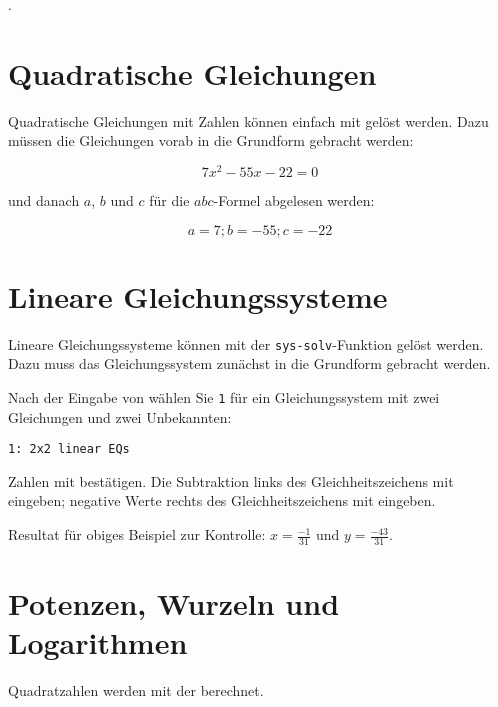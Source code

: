 .
\newpage


\section{Quadratische Gleichungen}\label{quadGL}
Quadratische Gleichungen mit Zahlen können einfach mit  gelöst werden. Dazu müssen die Gleichungen vorab in die Grundform gebracht werden:

$$7x^2 - 55x - 22 = 0$$

und danach $a$, $b$ und $c$ für die $abc$-Formel abgelesen werden:

$$a=7; b=-55; c=-22$$


\section{Lineare Gleichungssysteme}\label{gleichungssysteme}
Lineare Gleichungssysteme können mit der \texttt{sys-solv}-Funktion gelöst werden.
Dazu muss das Gleichungssystem zunächst in die Grundform gebracht werden.


Nach der Eingabe von  wählen Sie \texttt{1} für ein Gleichungssystem mit zwei Gleichungen und zwei Unbekannten:

\texttt{1: 2x2 linear EQs}

Zahlen mit  bestätigen. Die Subtraktion links des
Gleichheitszeichens mit  eingeben; negative Werte rechts
des Gleichheitszeichens mit  eingeben.

Resultat für obiges Beispiel zur Kontrolle: $x=\frac{-1}{31}$ und
$y=\frac{-43}{31}$.

\newpage


\section{Potenzen, Wurzeln und
Logarithmen}\label{ln_log}\label{xhoch_nwurz}

Quadratzahlen werden mit der  berechnet.

